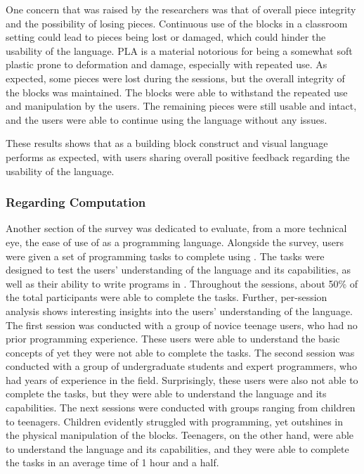 One concern that was raised by the researchers was that of overall piece integrity and the possibility of losing pieces.
Continuous use of the blocks in a classroom setting could lead to pieces being lost or damaged, which could hinder the usability of the language.
PLA is a material notorious for being a somewhat soft plastic prone to deformation and damage, especially with repeated use.
As expected, some pieces were lost during the sessions, but the overall integrity of the blocks was maintained.
The blocks were able to withstand the repeated use and manipulation by the users. The remaining pieces were still usable and intact, and the users were able to continue using the language without any issues.

These results shows that \sculpt as a building block construct and visual language performs as expected, with users sharing overall positive feedback regarding the usability of the language.

\subsubsection{Regarding Computation}
\label{sec:results:validation:computation}

Another section of the survey was dedicated to evaluate, from a more technical eye, the ease of use of \sculpt as a programming language.
Alongside the survey, users were given a set of programming tasks to complete using \sculpt.
The tasks were designed to test the users' understanding of the language and its capabilities, as well as their ability to write programs in \sculpt.
Throughout the sessions, about 50\% of the total participants were able to complete the tasks.
Further, per-session analysis shows interesting insights into the users' understanding of the language.
The first session was conducted with a group of novice teenage users, who had no prior programming experience.
These users were able to understand the basic concepts of \sculpt yet they were not able to complete the tasks.
The second session was conducted with a group of undergraduate students and expert programmers, who had years of experience in the field.
Surprisingly, these users were also not able to complete the tasks, but they were able to understand the language and its capabilities.
The next sessions were conducted with groups ranging from children to teenagers. Children evidently struggled with programming, yet outshines in the physical manipulation of the blocks.
Teenagers, on the other hand, were able to understand the language and its capabilities, and they were able to complete the tasks in an average time of 1 hour and a half.

